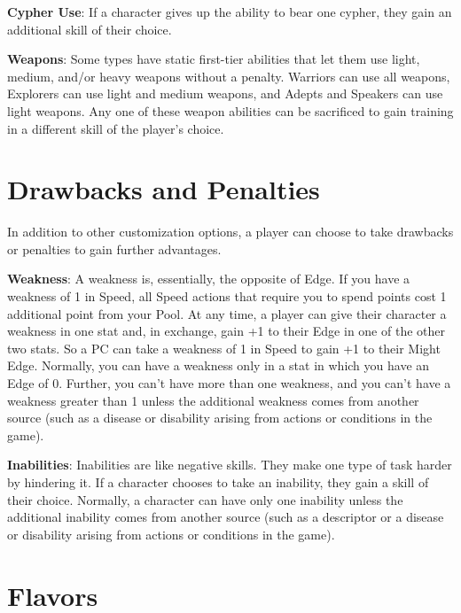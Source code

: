 \textbf{Cypher Use}: If a character gives up the ability to bear one cypher, they gain an additional skill of their choice.

\textbf{Weapons}: Some types have static first-tier abilities that let them use light, medium, and/or heavy weapons without a penalty. Warriors can use all weapons, Explorers can use light and medium weapons, and Adepts and Speakers can use light weapons. Any one of these weapon abilities can be sacrificed to gain training in a different skill of the player’s choice.

\section{Drawbacks and Penalties}

In addition to other customization options, a player can choose to take drawbacks or penalties to gain further advantages.

\textbf{Weakness}: A weakness is, essentially, the opposite of Edge. If you have a weakness of 1 in Speed, all Speed actions that require you to spend points cost 1 additional point from your Pool. At any time, a player can give their character a weakness in one stat and, in exchange, gain +1 to their Edge in one of the other two stats. So a PC can take a weakness of 1 in Speed to gain +1 to their Might Edge.
Normally, you can have a weakness only in a stat in which you have an Edge of 0. Further, you can’t have more than one weakness, and you can’t have a weakness greater than 1 unless the additional weakness comes from another source (such as a disease or disability arising from actions or conditions in the game).

\textbf{Inabilities}: Inabilities are like negative skills. They make one type of task harder by hindering it. If a character chooses to take an inability, they gain a skill of their choice. Normally, a character can have only one inability unless the additional inability comes from another source (such as a descriptor or a disease or disability arising from actions or conditions in the game).

\section{Flavors}

